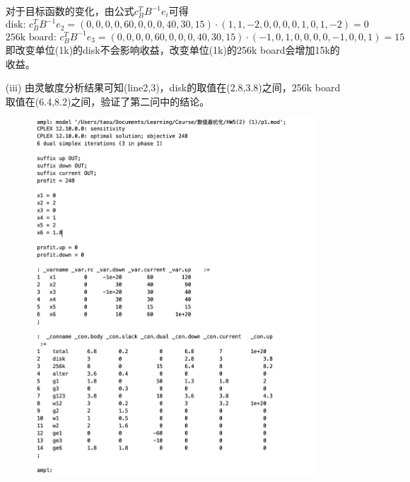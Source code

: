 \documentclass[10pt]{article}
\begin{document}
\begin{itemize}
对于目标函数的变化，由公式$c_B^TB^{-1}e_{i}$可得
$$\text{disk: } c_B^TB^{-1}e_{2} = (0,0,0,0,60,0,0,0,40,30,15)\cdot (1,1,-2,0,0,0,0,1,0,1,-2) = 0$$
$$\text{256k board: } c_B^TB^{-1}e_{3} = (0,0,0,0,60,0,0,0,40,30,15)\cdot (-1,0,1,0,0,0,0,-1,0,0,1) = 15$$
即改变单位(1k)的disk不会影响收益，改变单位(1k)的256k board会增加15k的收益。
\item [(iii)] 由灵敏度分析结果可知(line2,3)，disk的取值在(2.8,3.8)之间，256k board取值在(6.4,8.2)之间，验证了第二问中的结论。
\begin{figure}[H]
	\centering
	\includegraphics[width=0.5\linewidth]{p2-3.png}
	\label{fig.prob2}
\end{figure}
\end{itemize}
\end{document}
